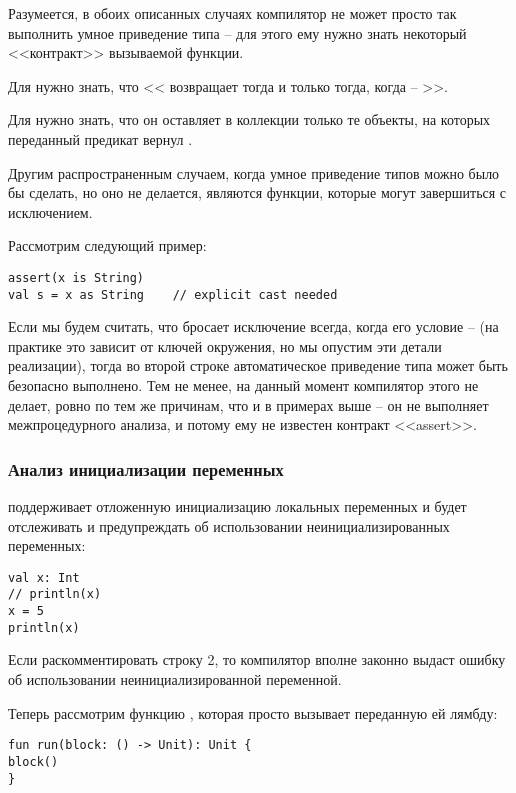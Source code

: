 Разумеется, в обоих описанных случаях компилятор не может просто так выполнить умное приведение типа -- для этого ему нужно знать некоторый <<контракт>> вызываемой функции.

Для  нужно знать, что << возвращает  тогда и только тогда, когда  -- >>.

Для  нужно знать, что он оставляет в коллекции только те объекты, на которых переданный предикат вернул .


\bigskip

Другим распространенным случаем, когда умное приведение типов можно было бы сделать, но оно не делается, являются функции, которые могут завершиться с исключением.

Рассмотрим следующий пример:

\begin{verbatim}
assert(x is String)
val s = x as String    // explicit cast needed
\end{verbatim}

Если мы будем считать, что  бросает исключение всегда, когда его условие --  (на практике это зависит от ключей окружения, но мы опустим эти детали реализации), тогда во второй строке автоматическое приведение типа может быть безопасно выполнено. Тем не менее, на данный момент компилятор  этого не делает, ровно по тем же причинам, что и в примерах выше -- он не выполняет межпроцедурного анализа, и потому ему не известен контракт <<assert>>.




\subsubsection{Анализ инициализации переменных}

 поддерживает отложенную инициализацию локальных переменных и будет отслеживать и предупреждать об использовании неинициализированных переменных:

\begin{verbatim}
val x: Int
// println(x)
x = 5
println(x)
\end{verbatim}

Если раскомментировать строку 2, то компилятор вполне законно выдаст ошибку об использовании неинициализированной переменной.

Теперь рассмотрим функцию , которая просто вызывает переданную ей лямбду:
\begin{verbatim}
fun run(block: () -> Unit): Unit {
block()
}
\end{verbatim}

